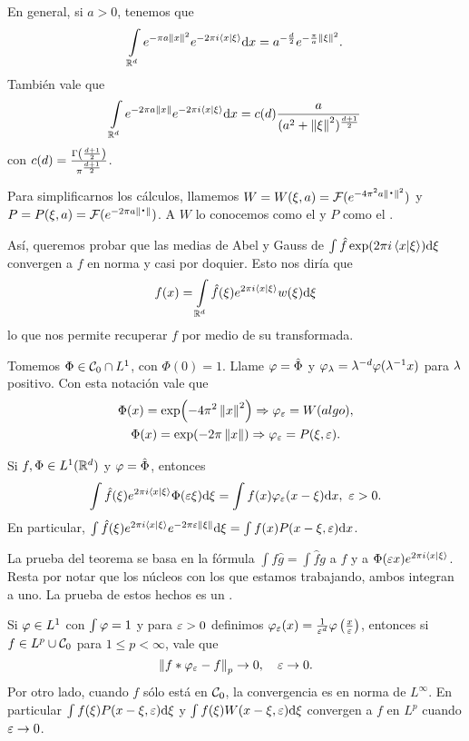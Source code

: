 \documentclass[12pt]{memoir}
\begin{document}
\begin{Th}
  En general, si $a>0$, tenemos que 
  $$\int\limits_{\mathbb{R}^d}e^{-\pi a\left\|x\right\|^2}e^{-2\pi i\braket{x}{\xi}}\dd x=a^{-\frac{d}{2}}e^{-\frac{\pi}{a}\left\|\xi\right\|^2}.$$
  También vale que 
  $$\int\limits_{\mathbb{R}^d}e^{-2\pi a\left\|x\right\|}e^{-2\pi i\braket{x}{\xi}}\dd x=c(d)\frac{a}{(a^2+\left\|\xi\right\|^2)^{\frac{d+1}{2}}}$$
  con $c(d)=\frac{\Gamma\left(\frac{d+1}{2}\right)}{\pi^{\frac{d+1}{2}}}$.
\end{Th}

\begin{ptcbp}
\end{ptcbp}

Para simplificarnos los cálculos, llamemos $W=W(\xi,a)=\cF(e^{-4\pi^2a\nm{\.}^2})$ y $P=P(\xi,a)=\cF(e^{-2\pi a\nm{\.}})$. A $W$ lo conocemos como el  y $P$ como el .\par 
Así, queremos probar que las medias de Abel y Gauss de $\int\hat{f}\exp(2\pi i\braket{x}{\xi})\dd\xi$ convergen a $f$ en norma y casi por doquier. Esto nos diría que 
$$f(x)=\int\limits_{\mathbb{R}^d}\hat{f}(\xi)e^{2\pi i\braket{x}{\xi}}w(\xi)\dd\xi$$
lo que nos permite recuperar $f$ por medio de su transformada.\par 
Tomemos $\Phi\in\mathcal{C}_0\cap L^1$, con $\Phi(0)=1$. Llame $\varphi=\hat\Phi$ y $\varphi_\lambda=\lambda^{-d}\varphi(\lambda^{-1}x)$ para $\lambda$ positivo. Con esta notación vale que 
\begin{gather*}
  \Phi(x)=\exp(-4\pi^2\left\|x\right\|^2)\Rightarrow\varphi_\varepsilon=W(algo),\\
  \Phi(x)=\exp(-2\pi\left\|x\right\|)\Rightarrow\varphi_\varepsilon=P(\xi,\varepsilon).
\end{gather*}
 
\begin{Th}\label{thm:tmaPendPara0208}
  Si $f,\Phi\in L^1(\mathbb{R}^d)$ y $\varphi=\hat\Phi$, entonces 
  $$\int\hat{f}(\xi) e^{2\pi i\braket{x}{\xi}}\Phi(\eps\xi)\dd\xi=\int f(x)\vf_\eps(x-\xi)\dd x,\ \eps>0.$$
  En particular, $\int\hat{f}(\xi)e^{2\pi i\braket{x}{\xi}}e^{-2\pi \varepsilon\left\|\xi\right\|}\dd\xi=\int f(x)P(x-\xi,\varepsilon)\dd x$.
\end{Th}

La prueba del teorema se basa en la fórmula $\int f\hat g=\int\hat fg$ a $f$ y a $\Phi(\varepsilon x)e^{2\pi i\braket{x}{\xi}}$. Resta por notar que los núcleos con los que estamos trabajando, ambos integran a uno. La prueba de estos hechos es un .

\begin{Th}\label{thm:segundoTmaPendPara0208}
  Si $\varphi\in L^1$ con $\int\varphi=1$ y para $\varepsilon>0$ definimos $\varphi_\varepsilon(x)=\frac{1}{\varepsilon^d}\varphi\left(\frac{x}{\varepsilon}\right)$, entonces si $f\in L^p\cup\mathcal{C}_0$ para $1\leq p<\infty$, vale que 
  $$\left\|f\ast\varphi_\varepsilon-f\right\|_p\to 0,\quad \varepsilon\to 0.$$
  Por otro lado, cuando $f$ sólo está en $\mathcal{C}_0$, la convergencia es en norma de $L^\infty$. En particular $\int f(\xi)P(x-\xi,\varepsilon)\dd\xi$ y $\int f(\xi)W(x-\xi,\varepsilon)\dd\xi$ convergen a $f$ en $L^p$ cuando $\varepsilon\to 0$.
\end{Th}
\end{document}
